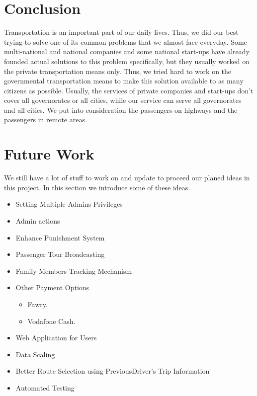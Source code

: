 \section{Conclusion}
\hspace{2cm} Transportation is an important part of our daily lives.
Thus, we did our best trying to solve one of its common problems that we almost face everyday.
Some multi-national and national companies and some national start-ups have already founded actual solutions to this problem specifically, but they usually worked on the private transportation means only.
Thus, we tried hard to work on the governmental transportation means to make this solution available to as many citizens as possible.
Usually, the services of private companies and start-ups don't cover all governorates or all cities, while our service can serve all governorates and all cities.
We put into consideration the passengers on highways and the passengers in remote areas.

\section{Future Work}
\hspace{2cm} We still have a lot of stuff to work on and update to proceed our planed ideas in this project. In this section we introduce some of these ideas.
\begin{itemize}
    \item Setting Multiple Admins Privileges
    \item Admin actions
    \item Enhance Punishment System
    \item Passenger Tour Broadcasting 
    \item Family Members Tracking Mechanism
    \item Other Payment Options
    \begin{itemize}
        \item Fawry.
        \item Vodafone Cash.
    \end{itemize}
    \item Web Application for Users
    \item Data Scaling
    \item Better Route Selection using PreviousDriver’s Trip Information
    \item Automated Testing
\end{itemize}